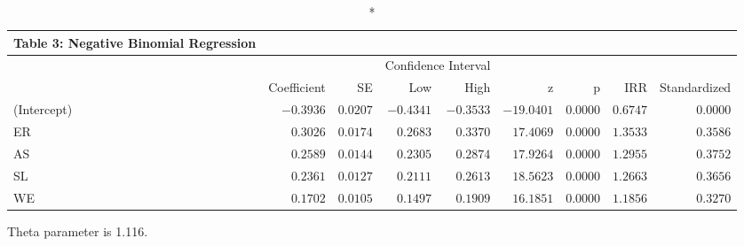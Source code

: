 \setlength{\LTpost}{0mm}
\begin{longtable}{l|rrrrrrrr}
\caption*{
{\large Table 3: Negative Binomial Regression}
} \\ 
\toprule
\multicolumn{1}{l}{} &  &  & \multicolumn{2}{c}{Confidence Interval} &  &  &  &  \\ 
\cmidrule(lr){4-5}
\multicolumn{1}{l}{} & Coefficient & SE & Low & High & z & p & IRR & Standardized \\ 
\midrule
(Intercept) & $-0.3936$ & $0.0207$ & $-0.4341$ & $-0.3533$ & $-19.0401$ & $0.0000$ & $0.6747$ & $0.0000$ \\ 
ER & $0.3026$ & $0.0174$ & $0.2683$ & $0.3370$ & $17.4069$ & $0.0000$ & $1.3533$ & $0.3586$ \\ 
AS & $0.2589$ & $0.0144$ & $0.2305$ & $0.2874$ & $17.9264$ & $0.0000$ & $1.2955$ & $0.3752$ \\ 
SL & $0.2361$ & $0.0127$ & $0.2111$ & $0.2613$ & $18.5623$ & $0.0000$ & $1.2663$ & $0.3656$ \\ 
WE & $0.1702$ & $0.0105$ & $0.1497$ & $0.1909$ & $16.1851$ & $0.0000$ & $1.1856$ & $0.3270$ \\ 
\bottomrule
\end{longtable}
\begin{minipage}{\linewidth}
Theta parameter is 1.116.\\
\end{minipage}

